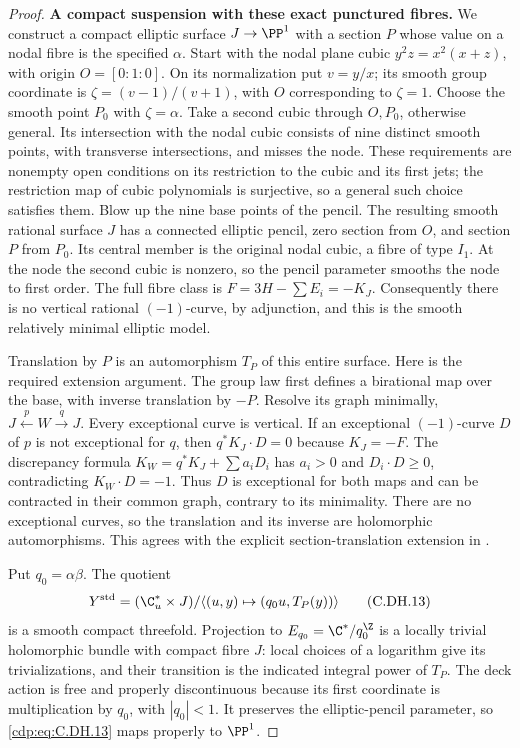 \begin{proof}
\par\medskip\noindent\textbf{A compact suspension with these exact punctured fibres.}
We construct a compact elliptic
surface $J\to\PP^1$ with a
section $P$ whose value on a
nodal fibre is the specified
$\alpha$. Start with the
nodal plane cubic
$y^2z=x^2(x+z)$, with origin
$O=[0:1:0]$. On its
normalization put
$v=y/x$; its smooth group
coordinate is
$\zeta=(v-1)/(v+1)$,
with $O$ corresponding to
$\zeta=1$. Choose the
smooth point $P_0$ with
$\zeta=\alpha$.
Take a second cubic
through $O,P_0$, otherwise
general. Its intersection
with the nodal cubic
consists of nine distinct
smooth points, with
transverse intersections,
and misses the node.
These requirements are
nonempty open conditions
on its restriction to
the cubic and its first
jets; the restriction
map of cubic polynomials
is surjective, so a
general such choice
satisfies them.
Blow up the nine
base points of the
pencil. The resulting
smooth rational surface
$J$ has a connected
elliptic pencil, zero
section from $O$, and
section $P$ from $P_0$.
Its central member is
the original nodal
cubic, a fibre of type
$I_1$. At the node the
second cubic is nonzero,
so the pencil parameter
smooths the node to
first order. The full
fibre class is
$F=3H-\sum E_i=-K_J$.
Consequently there is
no vertical rational
$(-1)$-curve, by
adjunction, and this
is the smooth relatively
minimal elliptic model.

Translation by $P$ is an
automorphism $T_P$ of
this entire surface.
Here is the required
extension argument.
The group law first
defines a birational
map over the base,
with inverse translation
by $-P$. Resolve its
graph minimally,
$J\xleftarrow{p}W\xrightarrow{q}J$.
Every exceptional curve
is vertical. If an
exceptional $(-1)$-curve
$D$ of $p$ is not
exceptional for $q$,
then $q^*K_J\cdot D=0$
because $K_J=-F$.
The discrepancy formula
$K_W=q^*K_J+\sum a_iD_i$
has $a_i>0$ and
$D_i\cdot D\ge0$,
contradicting $K_W\cdot D=-1$.
Thus $D$ is exceptional
for both maps and can
be contracted in their
common graph, contrary
to its minimality.
There are no exceptional
curves, so the translation
and its inverse are
holomorphic automorphisms.
This agrees with the explicit
section-translation extension
in \cite[\S7.6, pp.~33--34]{SchuttShioda2010}.

Put $q_0=\alpha\beta$.
The quotient
\[
 Y^{\rm std}=(\C^*_u\times J)/
        \langle(u,y)\mapsto(q_0u,T_P(y))\rangle
                                                               \tag{C.DH.13}\label{cdp:eq:C.DH.13}
\]
is a smooth compact
threefold. Projection to
$E_{q_0}=\C^*/q_0^{\Z}$
is a locally trivial
holomorphic bundle with
compact fibre $J$:
local choices of a
logarithm give its
trivializations, and
their transition is
the indicated integral
power of $T_P$.
The deck action is
free and properly
discontinuous because
its first coordinate
is multiplication by
$q_0$, with $|q_0|<1$.
It preserves the
elliptic-pencil parameter,
so \eqref{cdp:eq:C.DH.13} maps
properly to $\PP^1$.


\end{proof}

